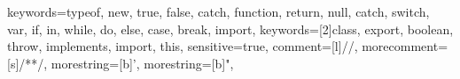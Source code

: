 {
    keywords={typeof, new, true, false, catch, function, return, null, catch, switch, var, if, in, while, do, else,
    case, break, import},
    keywords=[2]{class, export, boolean, throw, implements, import, this},
    sensitive=true,
    comment=[l]{//},
    morecomment=[s]{/*}{*/},
    morestring=[b]',
    morestring=[b]",
}
